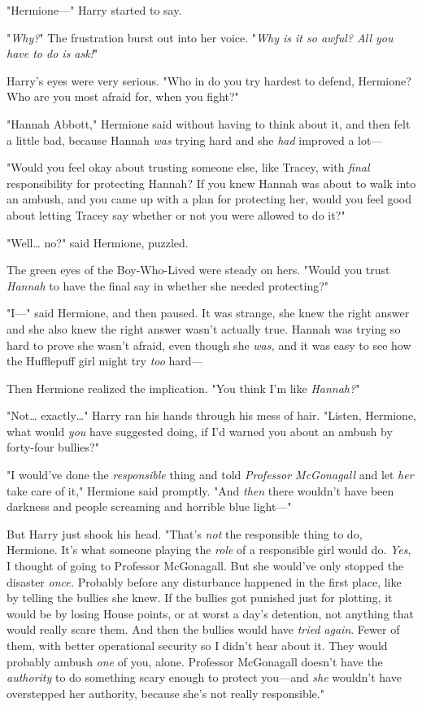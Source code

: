 "Hermione---" Harry started to say.

"\emph{Why?}" The frustration burst out into her voice. "\emph{Why is it so
awful? All you have to do is ask!}"

Harry's eyes were very serious. "Who in \SPHEW do you try hardest to
defend, Hermione? Who are you most afraid for, when you fight?"

"Hannah Abbott," Hermione said without having to think about it, and then felt
a little bad, because Hannah \emph{was} trying hard and she \emph{had} improved
a lot---

"Would you feel okay about trusting someone else, like Tracey, with
\emph{final} responsibility for protecting Hannah? If you knew Hannah was about
to walk into an ambush, and you came up with a plan for protecting her, would
you feel good about letting Tracey say whether or not you were allowed to do
it?"

"Well{\ldots} no?" said Hermione, puzzled.

The green eyes of the Boy-Who-Lived were steady on hers. "Would you trust
\emph{Hannah} to have the final say in whether she needed protecting?"

"I---" said Hermione, and then paused. It was strange, she knew the right
answer and she also knew the right answer wasn't actually true. Hannah was
trying so hard to prove she wasn't afraid, even though she \emph{was,} and it
was easy to see how the Hufflepuff girl might try \emph{too} hard---

Then Hermione realized the implication. "You think I'm like \emph{Hannah?}"

"Not{\ldots} exactly{\ldots}" Harry ran his hands through his mess of hair.
"Listen, Hermione, what would \emph{you} have suggested doing, if I'd warned
you about an ambush by forty-four bullies?"

"I would've done the \emph{responsible} thing and told \emph{Professor
McGonagall} and let \emph{her} take care of it," Hermione said promptly. "And
\emph{then} there wouldn't have been darkness and people screaming and horrible
blue light---"

But Harry just shook his head. "That's \emph{not} the responsible thing to do,
Hermione. It's what someone playing the \emph{role} of a responsible girl would
do. \emph{Yes}, I thought of going to Professor McGonagall. But she would've
only stopped the disaster \emph{once.} Probably before any disturbance happened
in the first place, like by telling the bullies she knew. If the bullies got
punished just for plotting, it would be by losing House points, or at worst a
day's detention, not anything that would really scare them. And then the
bullies would have \emph{tried again}. Fewer of them, with better operational
security so I didn't hear about it. They would probably ambush \emph{one} of
you, alone. Professor McGonagall doesn't have the \emph{authority} to do
something scary enough to protect you---and \emph{she} wouldn't have
overstepped her authority, because she's not really responsible."

